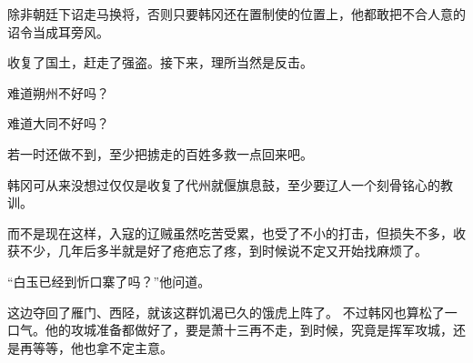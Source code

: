 除非朝廷下诏走马换将，否则只要韩冈还在置制使的位置上，他都敢把不合人意的诏令当成耳旁风。

收复了国土，赶走了强盗。接下来，理所当然是反击。

难道朔州不好吗？

难道大同不好吗？

若一时还做不到，至少把掳走的百姓多救一点回来吧。

韩冈可从来没想过仅仅是收复了代州就偃旗息鼓，至少要辽人一个刻骨铭心的教训。

而不是现在这样，入寇的辽贼虽然吃苦受累，也受了不小的打击，但损失不多，收获不少，几年后多半就是好了疮疤忘了疼，到时候说不定又开始找麻烦了。

“白玉已经到忻口寨了吗？”他问道。

这边夺回了雁门、西陉，就该这群饥渴已久的饿虎上阵了。
不过韩冈也算松了一口气。他的攻城准备都做好了，要是萧十三再不走，到时候，究竟是挥军攻城，还是再等等，他也拿不定主意。
